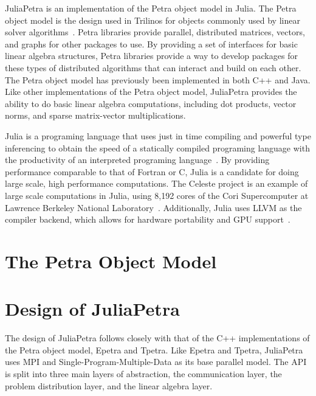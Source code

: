 \documentclass[acmsmall]{acmart}
\begin{document}
	JuliaPetra is an implementation of the Petra object model in Julia.
	The Petra object model is the design used in Trilinos for objects commonly used by linear solver algorithms~\cite{Heroux:2005:Trilinos}.
	Petra libraries provide parallel, distributed matrices, vectors, and graphs for other packages to use.
	By providing a set of interfaces for basic linear algebra structures, Petra libraries provide a way
	to develop packages for these types of distributed algorithms that can interact and build on each other.
	The Petra object model has previously been implemented in both C++ and Java.
	Like other implementations of the Petra object model, JuliaPetra provides the ability to do basic linear algebra computations, including dot products, vector norms, and sparse matrix-vector multiplications.
	
	Julia is a programing language that uses just in time compiling and powerful type inferencing
	to obtain the speed of a statically compiled programing language with the productivity of an
	interpreted programing language~\cite{Bezanson:2017:FreshApproach}.
	By providing performance comparable to that of Fortran or C, Julia is a candidate for doing large scale,
	high performance computations.
	The Celeste project is an example of large scale computations in Julia,
	using 8,192 cores of the Cori Supercomputer
	at Lawrence Berkeley National Laboratory~\cite{Bezanson:2017:FreshApproach}.
	Additionally, Julia uses LLVM as the compiler backend, which allows for hardware portability and GPU support~\cite{Besard:2016:Julia-GPU}.
	
	
	\section{The Petra Object Model}
	
	
	\section{Design of JuliaPetra}
	
	The design of JuliaPetra follows closely with that of the C++ implementations of the
	Petra object model, Epetra and Tpetra.
	Like Epetra and Tpetra, JuliaPetra uses MPI and Single-Program-Multiple-Data as its base parallel model.
	The API is split into three main layers of abstraction, the communication layer, the problem distribution layer, and the linear algebra layer.
	
\end{document}
